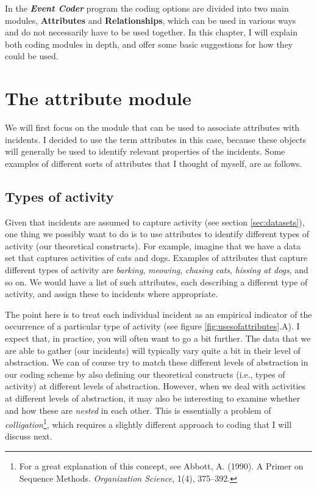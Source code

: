 \documentclass{memoir}
\begin{document}
In the \textbf{\emph{Event Coder}} program the coding options are divided into two main modules, \textbf{Attributes} and \textbf{Relationships}, which can be used in various ways and do not necessarily have to be used together. In this chapter, I will explain both coding modules in depth, and offer some basic suggestions for how they could be used.

\section{The attribute module}
\label{sec:attributemodule}

We will first focus on the module that can be used to associate attributes with incidents. I decided to use the term attributes in this case, because these objects will generally be used to identify relevant properties of the incidents. Some examples of different sorts of attributes that I thought of myself, are as follows.

\subsection{Types of activity}
\label{sec:types of activity}


Given that incidents are assumed to capture activity (see section \ref{sec:datasets}), one thing we possibly want to do is to use attributes to identify different types of activity (our theoretical constructs). For example, imagine that we have a data set that captures activities of cats and dogs. Examples of attributes that capture different types of activity are \emph{barking}, \emph{meowing}, \emph{chasing cats}, \emph{hissing at dogs}, and so on. We would have a list of such attributes, each describing a different type of activity, and assign these to incidents where appropriate.

The point here is to treat each individual incident as an empirical indicator of the occurrence of a particular type of activity (see figure \ref{fig:usesofattributes}.A). I expect that, in practice, you will often want to go a bit further. The data that we are able to gather (our incidents) will typically vary quite a bit in their level of abstraction. We can of course try to match these different levels of abstraction in our coding scheme by also defining our theoretical constructs (i.e., types of activity) at different levels of abstraction. However, when we deal with activities at different levels of abstraction, it may also be interesting to examine whether and how these are \emph{nested} in each other. This is essentially a problem of \emph{colligation}\footnote{For a great explanation of this concept, see Abbott, A. (1990). A Primer on Sequence Methods. \emph{Organization Science}, 1(4), 375–392.}, which requires a slightly different approach to coding that I will discuss next.
\end{document}
